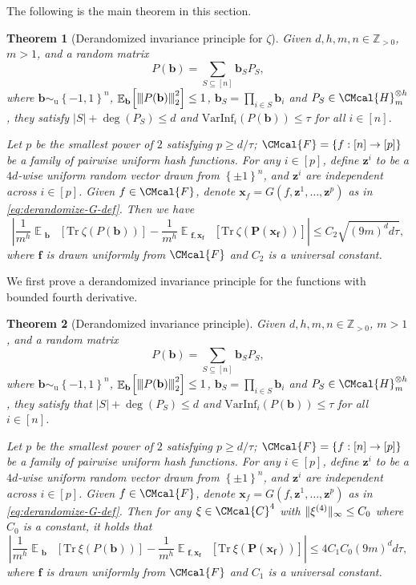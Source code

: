 \documentclass[11pt]{article}
\def\C{\CMcal{C}}
\def\F{\CMcal{F}}
\def\H{\CMcal{H}}
\theoremstyle{plain}
\newtheorem{theorem}{Theorem}[section]
\theoremstyle{definition}
\newcommand {\minusspace} {\: \! \!}
\newcommand {\Fn} [2] {\ensuremath{ #1 \minusspace \Br{ #2 } }}
\newcommand {\set} [1] {\ensuremath{ \left\lbrace #1 \right\rbrace }}
\newcommand {\br} [1] {\ensuremath{ \left( #1 \right) }}
\newcommand {\Br} [1] {\ensuremath{ \left[ #1 \right] }}
\DeclarePairedDelimiter{\norm}{\lVert}{\rVert}
\newcommand {\ab} [1] {\ensuremath{ \left| #1 \right| }}
\DeclareMathOperator*{\bigE}{\mathbb{E}}
\newcommand {\expec} [2] {\Fn{\bigE_{\substack{#1}}}{#2}}
\newcommand{\nnorm}[1]{{\left\vert\kern-0.25ex\left\vert\kern-0.25ex\left\vert #1
		\right\vert\kern-0.25ex\right\vert\kern-0.25ex\right\vert}}
\newcommand {\Tr} {\ensuremath{ \mathrm{Tr} }}
\newcommand{\posint}{{\mathbb Z}_{>0}}
\newcommand{\randP}{\ensuremath{\mathbf{P}}}
\newcommand{\randb}{\ensuremath{\mathbf{b}}}
\newcommand{\randz}{\ensuremath{\mathbf{z}}}
\newcommand{\randx}{\ensuremath{\mathbf{x}}}
\newcommand{\randf}{\ensuremath{\mathbf{f}}}
\newcommand{\herspace}[1]{\ensuremath{\H_m^{\otimes #1}}}
\newcommand{\varinfi}[1]{\ensuremath{\mathrm{VarInf}_i}\br{#1}}
\newcommand{\bits}[1]{\ensuremath{\set{-1,1}^{#1}}}
\newcommand{\usim}{\ensuremath{\sim_{\mathrm{u}}}}
\newcommand{\1}{\mathbb{1}} %
\begin{document}
The following is the main theorem in this section.
\begin{theorem}[Derandomized invariance principle for $\zeta$]\label{thm:derandomize}
Given $d,h,m,n\in\posint$, $m>1$, and a random matrix
\[P(\randb)=\sum_{S\subseteq[n]}\randb_SP_S,\]
where $\randb\usim\bits{n}$, $\expec{\randb}{\nnorm{P(\randb)}_2^2}\leq1$, $\randb_S=\prod_{i\in S}\randb_i$ and $P_S\in\herspace{h}$, they satisfy  $\ab{S}+\deg\br{P_S}\leq d$ and $\varinfi{P(\randb)}\leq\tau$ for all $i\in[n]$. 

Let $p$ be the smallest power of $2$ satisfying $p\ge d/\tau$; $\F=\set{f:[n]\to[p]}$ be a family of pairwise uniform hash functions. For any $i \in [p]$, define $\randz^i$ to be a $4d$-wise uniform random vector drawn from $\set{\pm 1}^n$, and $\randz^i$ are independent across $i\in[p]$. Given $f\in\F$, denote $\randx_f=G\br{f,\randz^1,\dots,\randz^p}$ as in \cref{eq:derandomize-G-def}. Then we have
\[\ab{\frac{1}{m^h}\expec{\randb}{\Tr~\zeta\br{P(\randb)}}-\frac{1}{m^h}\expec{\randf,\randx_\randf}{\Tr~\zeta\br{\randP(\randx_\randf)}}}\leq C_2\sqrt{(9m)^dd\tau},\]
where $\randf$ is drawn uniformly from $\F$ and $C_2$ is a universal constant.
\end{theorem}

We first prove a derandomized invariance principle for the functions with bounded fourth derivative.
\begin{theorem}[Derandomized invariance principle]\label{thm:smoothderandomize}
Given $d,h,m,n\in\posint$, $m>1$, and a random matrix
\[P(\randb)=\sum_{S\subseteq[n]}\randb_SP_S,\]
where $\randb\usim\bits{n}$, $\expec{\randb}{\nnorm{P(\randb)}_2^2}\leq1$, $\randb_S=\prod_{i\in S}\randb_i$ and $P_S\in\herspace{h}$, they satisfy that  $\ab{S}+\deg\br{P_S}\leq d$ and $\varinfi{P(\randb)}\leq\tau$ for all $i\in[n]$. 

Let $p$ be the smallest power of $2$ satisfying $p\ge d/\tau$; $\F=\set{f:[n]\to[p]}$ be a family of pairwise uniform hash functions. For any $i\in[p]$, define $\randz^i$ to be a $4d$-wise uniform random vector drawn from $\set{\pm 1}^n$, and $\randz^i$ are independent across $i\in[p]$. Given $f\in\F$, denote $\randx_f=G\br{f,\randz^1,\dots,\randz^p}$ as in \cref{eq:derandomize-G-def}. Then for any $\xi\in\C^4$ with $\norm{\xi^{(4)}}_\infty\leq C_0$ where $C_0$ is a constant, it holds that 
\[\ab{\frac{1}{m^h}\expec{\randb}{\Tr~\xi\br{P(\randb)}}-\frac{1}{m^h}\expec{\randf,\randx_\randf}{\Tr~\xi\br{\randP(\randx_\randf)}}}\leq 4C_1C_0(9m)^dd\tau,\]
where $\randf$ is drawn uniformly from $\F$ and $C_1$ is a universal constant.
\end{theorem}
\end{document}
